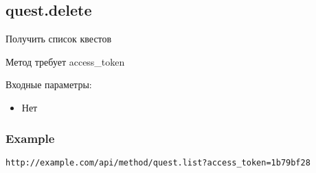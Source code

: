 \subsection{quest.delete}
Получить список квестов

Метод требует access\_token

Входные параметры:
\begin{itemize}
  \item Нет
\end{itemize}

\subsubsection{Example}
\begin{Verbatim}[frame=single]
http://example.com/api/method/quest.list?access_token=1b79bf28
\end{Verbatim}
